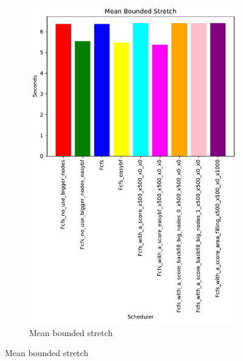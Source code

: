\documentclass[a4paper]{article}
\begin{document}
\begin{figure}[H]
\begin{subfigure}[b]{0.4\linewidth}\centering\includegraphics[width=1\linewidth]{MBSS/plot/Results_Size_And_Data_2022-01-24->2022-01-24_Mean_Stretch_With_a_Minimum_450_128_32_256_4_1024.pdf}\caption{Mean bounded stretch}\label{18}\end{subfigure}

\end{figure}
\end{document}
